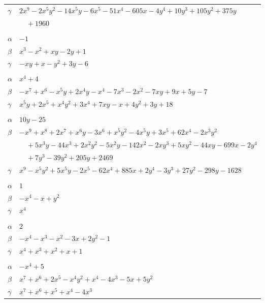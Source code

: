 \documentclass[11pt]{article}
\begin{document}
\begin{longtable}{@{}ll@{}}
$\gamma$ & $2x^{9}-2x^{5}y^{2}-14x^{5}y-6x^{5}-51x^{4}-605x-4y^{4}+10y^{3}+105y^{2}+375y$\\
 & $\quad +1960$\\
\addlinespace[3pt]
\multicolumn{2}{@{}l}{$\{i,j\}=\{1,4\}$, $k_{ij}=3$}\\
$\alpha$ & $-1$\\
$\beta$ & $x^{3}-x^{2}+xy-2y+1$\\
$\gamma$ & $-xy+x-y^{2}+3y-6$\\
\addlinespace[3pt]
\multicolumn{2}{@{}l}{$\{i,j\}=\{1,11\}$, $k_{ij}=3^{2}\cdot 5$}\\
$\alpha$ & $x^{4}+4$\\
$\beta$ & $-x^{7}+x^{6}-x^{5}y+2x^{4}y-x^{4}-7x^{3}-2x^{2}-7xy+9x+5y-7$\\
$\gamma$ & $x^{5}y+2x^{5}+x^{4}y^{2}+3x^{4}+7xy-x+4y^{2}+3y+18$\\
\addlinespace[3pt]
\multicolumn{2}{@{}l}{$\{i,j\}=\{1,30\}$, $k_{ij}=3^{2}\cdot 5^{4}$}\\
$\alpha$ & $10y-25$\\
$\beta$ & $-x^{9}+x^{8}+2x^{7}+x^{6}y-3x^{6}+x^{5}y^{2}-4x^{5}y+3x^{5}+62x^{4}-2x^{3}y^{2}$\\
 & $\quad +5x^{3}y-44x^{3}+2x^{2}y^{2}-5x^{2}y-142x^{2}-2xy^{3}+5xy^{2}-44xy-699x-2y^{4}$\\
 & $\quad +7y^{3}-39y^{2}+205y+2469$\\
$\gamma$ & $x^{9}-x^{5}y^{2}+5x^{5}y-2x^{5}-62x^{4}+885x+2y^{4}-3y^{3}+27y^{2}-298y-1628$\\
\addlinespace[3pt]
\multicolumn{2}{@{}l}{$\{i,j\}=\{2,3\}$, $k_{ij}=2^{2}$}\\
$\alpha$ & $1$\\
$\beta$ & $-x^{4}-x+y^{2}$\\
$\gamma$ & $x^{4}$\\
\addlinespace[3pt]
\multicolumn{2}{@{}l}{$\{i,j\}=\{2,18\}$, $k_{ij}=2\cdot 5$}\\
$\alpha$ & $2$\\
$\beta$ & $-x^{4}-x^{3}-x^{2}-3x+2y^{2}-1$\\
$\gamma$ & $x^{4}+x^{3}+x^{2}+x+1$\\
\addlinespace[3pt]
\multicolumn{2}{@{}l}{$\{i,j\}=\{2,20\}$, $k_{ij}=2^{2}\cdot 5$}\\
$\alpha$ & $-x^{4}+5$\\
$\beta$ & $x^{7}+x^{6}+2x^{5}-x^{4}y^{2}+x^{4}-4x^{3}-5x+5y^{2}$\\
$\gamma$ & $x^{7}+x^{6}+x^{5}+x^{4}-4x^{3}$\\

\end{longtable}
\end{document}
